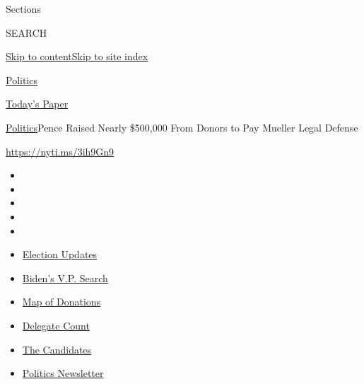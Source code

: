 Sections

SEARCH

\protect\hyperlink{site-content}{Skip to
content}\protect\hyperlink{site-index}{Skip to site index}

\href{https://www.nytimes.com/section/politics}{Politics}

\href{https://myaccount.nytimes.com/auth/login?response_type=cookie\&client_id=vi}{}

\href{https://www.nytimes.com/section/todayspaper}{Today's Paper}

\href{/section/politics}{Politics}\textbar{}Pence Raised Nearly
\$500,000 From Donors to Pay Mueller Legal Defense

\url{https://nyti.ms/3ih9Gn9}

\begin{itemize}
\item
\item
\item
\item
\item
\end{itemize}

\begin{itemize}
\item
  \href{https://www.nytimes.com/2020/07/31/us/elections/biden-vs-trump.html?action=click\&pgtype=Article\&state=default\&region=TOP_BANNER\&context=storylines_menu}{Election
  Updates}
\item
  \href{https://www.nytimes.com/article/biden-vice-president-2020.html?action=click\&pgtype=Article\&state=default\&region=TOP_BANNER\&context=storylines_menu}{Biden's
  V.P. Search}
\item
  \href{https://www.nytimes.com/interactive/2020/07/24/us/politics/trump-biden-campaign-donors.html?action=click\&pgtype=Article\&state=default\&region=TOP_BANNER\&context=storylines_menu}{Map
  of Donations}
\item
  \href{https://www.nytimes.com/interactive/2020/us/elections/delegate-count-primary-results.html?action=click\&pgtype=Article\&state=default\&region=TOP_BANNER\&context=storylines_menu}{Delegate
  Count}
\item
  \href{https://www.nytimes.com/interactive/2019/us/politics/2020-presidential-candidates.html?action=click\&pgtype=Article\&state=default\&region=TOP_BANNER\&context=storylines_menu}{The
  Candidates}
\item
  \href{https://www.nytimes.com/newsletters/politics?action=click\&pgtype=Article\&state=default\&region=TOP_BANNER\&context=storylines_menu}{Politics
  Newsletter}
\end{itemize}

